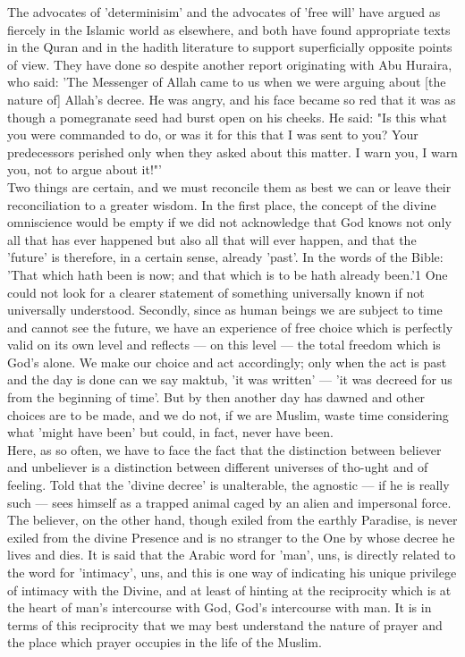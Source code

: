 \documentclass[11pt, b5paper, twoside]{book}
\begin{document}
The advocates of 'determinisim' and the advocates of 'free will' have argued as fiercely in the 
Islamic world as elsewhere, and both have found appropriate texts in the Quran and in the hadith 
literature to support superficially opposite points of view. They have done so despite another report 
originating with Abu Huraira, who said: 'The Messenger of Allah came to us when we were arguing about 
[the nature of] Allah's decree. He was angry, and his face became so red that it was as though a 
pomegranate seed had burst open on his cheeks. He said: "Is this what you were commanded to do, or 
was it for this that I was sent to you? Your predecessors perished only when they asked about this 
matter. I warn you, I warn you, not to argue about it!"' \\

Two things are certain, and we must reconcile them as best we can or leave their reconciliation to a 
greater wisdom. In the first place, the concept of the divine omniscience would be empty if we did 
not acknowledge that God knows not only all that has ever happened but also all that will ever 
happen, and that the 'future' is therefore, in a certain sense, already 'past'. In the words of the 
Bible: 'That which hath been is now; and that which is to be hath already been.'1 One could not look 
for a clearer statement of something universally known if not universally understood. Secondly, since 
as human beings we are subject to time and cannot see the future, we have an experience of free 
choice which is perfectly valid on its own level and reflects --- on this level --- the total freedom 
which is God's alone. We make our choice and act accordingly; only when the act is past and the day 
is done can we say maktub, 'it was written' --- 'it was decreed for us from the beginning of time'. But 
by then another day has dawned and other choices are to be made, and we do not, if we are Muslim, 
waste time considering what 'might have been' but could, in fact, never have been. \\

Here, as so often, we have to face the fact that the distinction between believer and unbeliever is a 
distinction between different universes of tho\hyp{}ught and of feeling. Told that the 'divine decree' is 
unalterable, the agnostic --- if he is really such --- sees himself as a trapped animal caged by an alien 
and impersonal force. The believer, on the other hand, though exiled from the earthly Paradise, is 
never exiled from the divine Presence and is no stranger to the One by whose decree he lives and 
dies. It is said that the Arabic word for 'man', uns, is directly related to the word for 'intimacy', 
uns, and this is one way of indicating his unique privilege of intimacy with the Divine, and at least 
of hinting at the reciprocity which is at the heart of man's intercourse with God, God's intercourse 
with man. It is in terms of this reciprocity that we may best understand the nature of prayer and the 
place which prayer occupies in the life of the Muslim. \\
\end{document}
